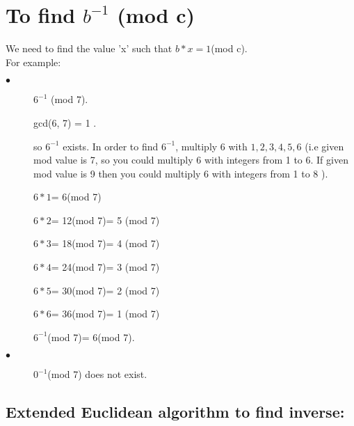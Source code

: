 \documentclass{article}
\begin{document}
\section{To find $b^{-1}$ (mod c)}
We need to find the value 'x' such that $b*x=1 $(mod c).\\
For example:
\begin{description}
	\item[$\bullet$] $6^{-1}$ (mod 7).
	
	gcd(6, 7) = 1 .
	
	so $6^{-1}$ exists. In order to find $6^{-1}$, multiply 6 with ${1,2,3,4,5,6}$
	(i.e given mod value is 7, so you could multiply 6 with integers from 1 to 6. If given mod value is 9 then you could multiply 6 with integers from 1 to 8 ).
	 
	 \quad$6*1$= 6(mod 7)
	 
	\quad$6*2$= 12(mod 7)= 5 (mod 7)
	
	\quad$6*3$= 18(mod 7)= 4 (mod 7)
	
	\quad$6*4$= 24(mod 7)= 3 (mod 7)
	
	\quad$6*5$= 30(mod 7)= 2 (mod 7)
	
	\quad$6*6$= 36(mod 7)= 1 (mod 7)
	
	\quad$6^{-1}$(mod 7)= 6(mod 7).
	\item[$\bullet$] $0^{-1}$(mod 7) does not exist.   
	
	
\end{description}

\subsection{Extended Euclidean algorithm to find inverse:}
\end{document}
